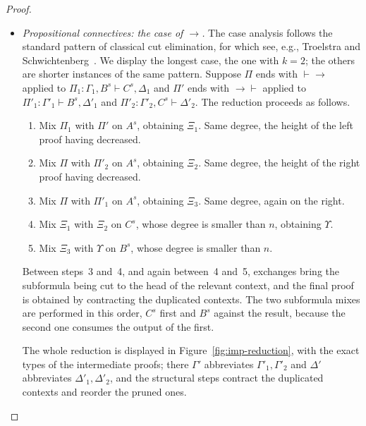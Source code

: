 \documentclass{article}
\newcommand{\seq}[2]{{#1} \vdash{} {#2}}
\newcommand{\pf}[2]{{#1}^{#2}} %
\theoremstyle{definition}
\begin{document}
\begin{proof}
\begin{enumerate}
\begin{itemize}
            \item \textit{Propositional connectives: the case of $\rightarrow$.} The case analysis follows the standard pattern of classical cut elimination, for which see, e.g., Troelstra and Schwichtenberg~\cite{Troelstra2000:BasicProofTheory}. We display the longest case, the one with $k=2$; the others are shorter instances of the same pattern. Suppose $\Pi$ ends with $\vdash\!\rightarrow$ applied to $\Pi_1 : \seq{\Gamma_1, \pf{B}{s}}{\pf{C}{s}, \Delta_1}$ and $\Pi'$ ends with $\rightarrow\!\vdash$ applied to $\Pi'_1 : \seq{\Gamma'_1}{\pf{B}{s}, \Delta'_1}$ and $\Pi'_2 : \seq{\Gamma'_2, \pf{C}{s}}{\Delta'_2}$. The reduction proceeds as follows.
            \begin{enumerate}
                \item Mix $\Pi_1$ with $\Pi'$ on $\pf{A}{s}$, obtaining $\Xi_1$. Same degree, the height of the left proof having decreased.
                \item Mix $\Pi$ with $\Pi'_2$ on $\pf{A}{s}$, obtaining $\Xi_2$. Same degree, the height of the right proof having decreased.
                \item Mix $\Pi$ with $\Pi'_1$ on $\pf{A}{s}$, obtaining $\Xi_3$. Same degree, again on the right.
                \item Mix $\Xi_1$ with $\Xi_2$ on $\pf{C}{s}$, whose degree is smaller than $n$, obtaining $\Upsilon$.
                \item Mix $\Xi_3$ with $\Upsilon$ on $\pf{B}{s}$, whose degree is smaller than $n$.
            \end{enumerate}
            Between steps~3 and~4, and again between~4 and~5, exchanges bring the subformula being cut to the head of the relevant context, and the final proof is obtained by contracting the duplicated contexts. The two subformula mixes are performed in this order, $\pf{C}{s}$ first and $\pf{B}{s}$ against the result, because the second one consumes the output of the first.

The whole reduction is displayed in Figure~\ref{fig:imp-reduction}, with the exact types of the intermediate proofs; there $\Gamma'$ abbreviates $\Gamma'_1,\Gamma'_2$ and $\Delta'$ abbreviates $\Delta'_1,\Delta'_2$, and the structural steps contract the duplicated contexts and reorder the pruned ones.


\end{itemize}
\end{enumerate}
\end{proof}
\end{document}
